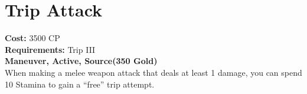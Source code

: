 \section{Trip Attack}
\textbf{Cost:} 3500 CP\\
\textbf{Requirements:} Trip III\\
\textbf{Maneuver, Active, Source(350 Gold)}\\
When making a melee weapon attack that deals at least 1 damage, you can spend 10 Stamina to gain a “free” trip attempt.\\
